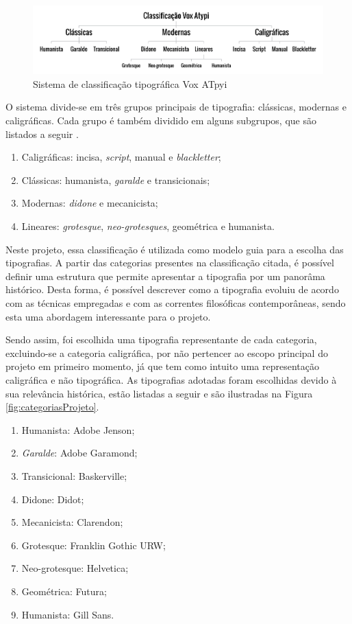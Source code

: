 \begin{figure}[H]
 \centering
  \includegraphics[width=1\linewidth]{figuras/classVox.pdf}
  \caption{Sistema de classificação tipográfica Vox ATpyi }
  \label{fig:categoria}
\end{figure}

O sistema divide-se em três grupos principais de tipografia: clássicas, modernas e caligráficas. Cada grupo é também dividido em alguns subgrupos, que são listados a seguir .

\begin{enumerate}
\item Caligráficas: incisa, \textit{script}, manual e \textit{blackletter};
\item Clássicas: humanista, \textit{garalde} e transicionais;
\item Modernas: \textit{didone} e mecanicista;
\item Lineares: \textit{grotesque}, \textit{neo-grotesques}, geométrica e humanista.
\end{enumerate}

Neste projeto, essa classificação é utilizada como modelo guia para a escolha das tipografias. A partir das categorias presentes na classificação citada, é possível definir uma estrutura que permite apresentar a tipografia por um panorâma histórico. Desta forma, é possível descrever como a tipografia evoluiu de acordo com as técnicas empregadas e com as correntes filosóficas contemporâneas, sendo esta uma abordagem interessante para o projeto.

Sendo assim, foi escolhida uma tipografia representante de cada categoria, excluindo-se a categoria caligráfica, por não pertencer ao escopo principal do projeto em primeiro momento, já que tem como intuito uma representação caligráfica e não tipográfica. As tipografias adotadas foram escolhidas devido à sua relevância histórica, estão listadas a seguir e são ilustradas na Figura \ref{fig:categoriasProjeto}.

\begin{enumerate}
\item Humanista: Adobe Jenson;
\item \textit{Garalde}: Adobe Garamond;
\item Transicional: Baskerville;
\item Didone: Didot;
\item Mecanicista: Clarendon;
\item Grotesque: Franklin Gothic URW;
\item Neo-grotesque: Helvetica;
\item Geométrica: Futura;
\item Humanista: Gill Sans.
\end{enumerate}


